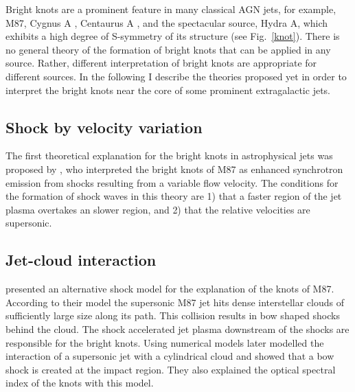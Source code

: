 Bright knots are a prominent feature in many classical AGN jets, for example, M87\citep{owen89}, Cygnus A \citep{steenbrugge07}, Centaurus A \citep{goodger10}, and the spectacular source, Hydra A,  which exhibits a high degree of S-symmetry of its structure \citep{taylor90} (see Fig.~\ref{knot}). There is no general theory of the formation of bright knots that can be applied in any source. Rather, different interpretation of bright knots are appropriate for different sources. In the following I describe the theories proposed yet in order to interpret the bright knots near the core of some prominent extragalactic jets. 

\subsection{Shock by velocity variation}
The first theoretical explanation for the bright knots in astrophysical jets was proposed by \citet{rees78}, who interpreted the bright knots of M87 as enhanced synchrotron emission from shocks resulting from a variable flow velocity. The conditions for the formation of shock waves in this theory are 1) that a faster region of the jet plasma overtakes an slower region, and 2) that the relative velocities are supersonic.  




\subsection{Jet-cloud interaction}
\citet{blandford79} presented an alternative shock model for the explanation of the knots of M87. According to their model the supersonic M87 jet hits dense interstellar clouds of sufficiently large size along its path. This collision results in bow shaped shocks behind the cloud. The shock accelerated jet plasma downstream of the shocks are responsible for the bright knots. Using numerical models \citet{coleman85} later modelled the interaction of a supersonic jet with a cylindrical cloud and showed that a bow shock is created at the impact region. They also explained the optical spectral index of the knots with this model.  

